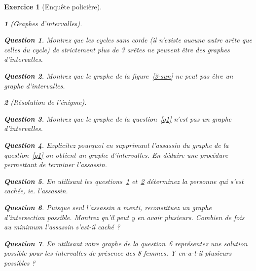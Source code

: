\documentclass{article}
\theoremstyle{exostyle}
\newtheorem{exo}{Exercice}
\theoremstyle{partiestyle}
\newtheorem{partie}{}[exo]
\theoremstyle{questionstyle}
\newtheorem{questionpartie}{Question}[partie]
\begin{document}
\begin{exo}[Enquête policière]
\begin{partie}[Graphes d'intervalles]
		\begin{questionpartie}
			Montrez que les cycles sans corde (il n'existe aucune autre arête que celles du cycle) de strictement plus de 3 arêtes ne peuvent être des graphes d'intervalles.\label{q2}
		\end{questionpartie}
		\begin{questionpartie}
			\label{q3}
			Montrez que le graphe de la figure~\ref{3-sun} ne peut pas être un graphe d'intervalles.
		\end{questionpartie}
	\end{partie}
	\begin{partie}[Résolution de l'énigme]
		\begin{questionpartie}
			Montrez que le graphe de la question~\ref{q1} n'est pas un graphe d'intervalles.
		\end{questionpartie}
		\begin{questionpartie}
			Explicitez pourquoi en supprimant l'assassin du graphe de la question~\ref{q1} on obtient un graphe d'intervalles. En déduire une procédure permettant de terminer l'assassin.
		\end{questionpartie}
		\begin{questionpartie}
			En utilisant les questions~\ref{q2} et~\ref{q3} déterminez la personne qui s'est cachée, {\em ie.} l'assassin.
		\end{questionpartie}
		\begin{questionpartie}
		\label{q4}
			Puisque seul l'assassin a menti, reconstituez un graphe d'intersection possible. Montrez qu'il peut y en avoir plusieurs. Combien de fois au minimum l'assassin s'est-il caché ?
			\end{questionpartie}
			\begin{questionpartie}
			En utilisant votre graphe de la question~\ref{q4} représentez une solution possible pour les intervalles de présence des 8 femmes. Y en-a-t-il plusieurs possibles ?
		\end{questionpartie}

	\end{partie}

\end{exo}
\end{document}
